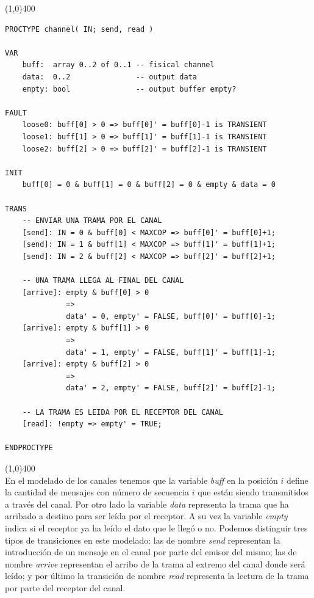 \documentclass[pdftex,a4paper,12pt]{book}
\begin{document}
\noindent \line(1,0){400}
\begin{verbatim}
PROCTYPE channel( IN; send, read )

VAR
    buff:  array 0..2 of 0..1 -- fisical channel
    data:  0..2               -- output data
    empty: bool               -- output buffer empty?

FAULT
    loose0: buff[0] > 0 => buff[0]' = buff[0]-1 is TRANSIENT
    loose1: buff[1] > 0 => buff[1]' = buff[1]-1 is TRANSIENT
    loose2: buff[2] > 0 => buff[2]' = buff[2]-1 is TRANSIENT
    
INIT
    buff[0] = 0 & buff[1] = 0 & buff[2] = 0 & empty & data = 0

TRANS
    -- ENVIAR UNA TRAMA POR EL CANAL
    [send]: IN = 0 & buff[0] < MAXCOP => buff[0]' = buff[0]+1;
    [send]: IN = 1 & buff[1] < MAXCOP => buff[1]' = buff[1]+1;
    [send]: IN = 2 & buff[2] < MAXCOP => buff[2]' = buff[2]+1;

    -- UNA TRAMA LLEGA AL FINAL DEL CANAL
    [arrive]: empty & buff[0] > 0 
              => 
              data' = 0, empty' = FALSE, buff[0]' = buff[0]-1;
    [arrive]: empty & buff[1] > 0 
              => 
              data' = 1, empty' = FALSE, buff[1]' = buff[1]-1;
    [arrive]: empty & buff[2] > 0 
              => 
              data' = 2, empty' = FALSE, buff[2]' = buff[2]-1;

    -- LA TRAMA ES LEIDA POR EL RECEPTOR DEL CANAL
    [read]: !empty => empty' = TRUE;

ENDPROCTYPE

\end{verbatim}

\noindent \line(1,0){400}\\

En el modelado de los canales tenemos que la variable \textit{buff} en la posici\'on $i$ define la cantidad de mensajes con n\'umero de secuencia $i$ que est\'an siendo transmitidos a trav\'es del canal. Por otro lado la variable \textit{data} representa la trama que ha arribado a destino para ser le\'ida por el receptor. A su vez la variable \textit{empty} indica si el receptor ya ha le\'ido el dato que le lleg\'o o no. Podemos distinguir tres tipos de transiciones en este modelado: las de nombre \textit{send} representan la introducci\'on de un mensaje en el canal por parte del emisor del mismo; las de nombre \textit{arrive} representan el arribo de la trama al extremo del canal donde ser\'a le\'ido; y por \'ultimo la transici\'on de nombre \textit{read} representa la lectura de la trama por parte del receptor del canal.
\end{document}
